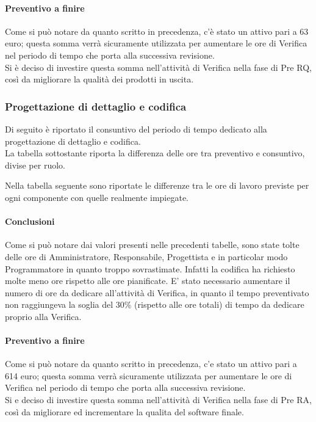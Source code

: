 \paragraph{Preventivo a finire}
Come si può notare da quanto scritto in precedenza, c'è stato un attivo pari a 63 euro; questa somma verrà sicuramente utilizzata per aumentare le ore di Verifica nel periodo di tempo che porta alla successiva revisione.\\
Si è deciso di investire questa somma nell'attività di Verifica nella fase di Pre RQ, così da migliorare la qualità dei prodotti in uscita.

\subsubsection{Progettazione di dettaglio e codifica}
Di seguito è riportato il consuntivo del periodo di tempo dedicato alla progettazione di dettaglio e codifica.\\
La tabella sottostante riporta la differenza delle ore tra preventivo e consuntivo, divise per ruolo.


Nella tabella seguente sono riportate le differenze tra le ore di lavoro previste per ogni componente con quelle realmente impiegate.


\paragraph{Conclusioni}
Come si può notare dai valori presenti nelle precedenti tabelle, sono state tolte delle ore di Amministratore, Responsabile, Progettista e in particolar modo Programmatore in quanto troppo sovrastimate.
Infatti la codifica ha richiesto molte meno ore rispetto alle ore pianificate.
E' stato necessario aumentare il numero di ore da dedicare all'attività di Verifica, in quanto il
tempo preventivato non raggiungeva la soglia del 30\% (rispetto alle ore totali) di tempo da dedicare
proprio alla Verifica.
\paragraph{Preventivo a finire}
Come si può notare da quanto scritto in precedenza, c'e stato un attivo pari a 614 euro; questa somma verrà sicuramente utilizzata per aumentare le ore di Verifica nel periodo di tempo che porta alla successiva revisione.\\
Si e deciso di investire questa somma nell'attività di Verifica nella fase di Pre RA, così da migliorare
ed incrementare la qualita del software finale.

